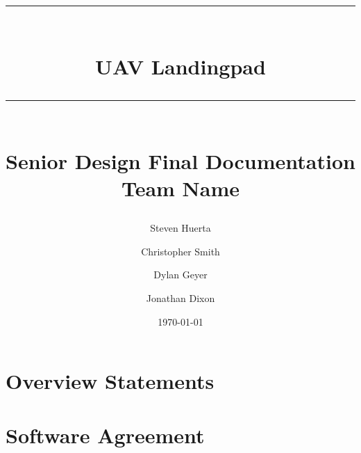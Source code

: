 \documentclass{book}
\title{{\color{MSBlue1} \rule{\linewidth}{0.5mm}}\\[2mm] {\huge \bfseries \color{MSBlue1} UAV Landingpad }\\[-1mm] {\color{MSBlue1}\rule{\linewidth}{0.5mm}} \\  \vfill
{\LARGE \bfseries \color{MSBlue2} Senior Design Final Documentation }\\  \vfill 
{\color{MSBlue1} Team Name} }
\author{\color{MSBlue1}  Steven Huerta \and \color{MSBlue1} Christopher Smith \and  \color{MSBlue1} Dylan Geyer \and \color{MSBlue1} Jonathan Dixon }
\date{\color{MSBlue1} \today}
\begin{document}
\frontmatter

\maketitle
\tableofcontents
{}

\chapter{Overview Statements}

%
 
\mainmatter




%
%


\agreement

\chapter{Software Agreement}


\end{document}
